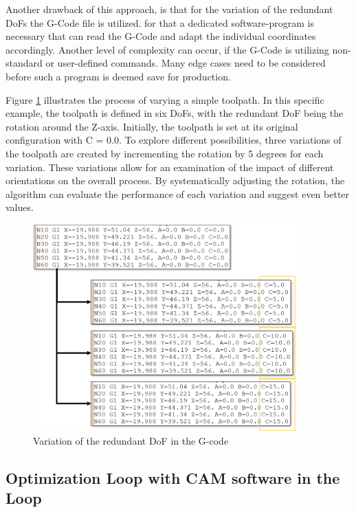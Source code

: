 Another drawback of this approach, is that for the variation of the redundant \acrshort{DoF}s the G-Code file is utilized. for that a dedicated software-program is necessary that can read the G-Code and adapt the individual coordinates accordingly. Another level of complexity can occur, if the G-Code is utilizing non-standard or user-defined commands. Many edge cases need to be considered before such a program is deemed save for production.       

Figure \ref{variation} illustrates the process of varying a simple toolpath. In this specific example, the toolpath is defined in six \acrshort{DoF}s, with the redundant \acrshort{DoF} being the rotation around the Z-axis. Initially, the toolpath is set at its original configuration with C = 0.0. To explore different possibilities, three variations of the toolpath are created by incrementing the rotation by 5 degrees for each variation. These variations allow for an examination of the impact of different orientations on the overall process. By systematically adjusting the rotation, the algorithm can evaluate the performance of each variation and suggest even better values.


\begin{figure}[H]
	\centerline{\includegraphics[width=0.9\textwidth]{figures/gcodevariation.png}}
	\caption{Variation of the redundant DoF in the G-code}
	\label{variation}
\end{figure}

\newpage
\subsection{Optimization Loop with CAM software in the Loop}

